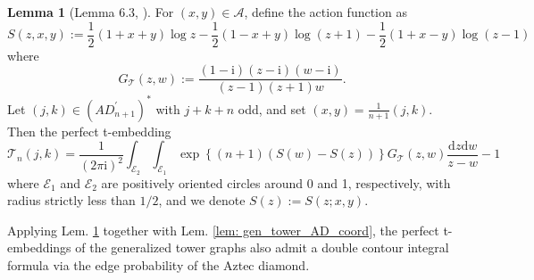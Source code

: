 \documentclass[12pt]{amsart}
\numberwithin{equation}{section}
\theoremstyle{definition}
\newtheorem{lemma}[thm]{Lemma}
\begin{document}
\begin{lemma}[Lemma 6.3, \cite{tower_AD_perfect} ]
\label{lem: t_embedding_coord_AD}
    For $(x, y) \in \mathcal A$, define the action function as 
    \[
    S(z,x,y):=\frac{1}{2}(1+x+y) \log z-\frac{1}{2}(1-x+y) \log (z+1)-\frac{1}{2}(1+x-y) \log (z-1)
    \]
    where
$$
G_{\mathcal{T}}(z, w):=\frac{(1-\mathrm{i})(z-\mathrm{i})(w-\mathrm{i})}{(z-1)(z+1) w}.
$$
Let $(j, k) \in\left(AD_{n+1}^{\prime}\right)^*$ with $j+k+n$ odd, and set $(x, y)=\frac{1}{n+1}(j, k)$. Then the perfect t-embedding
$$
\mathcal{T}_n(j, k)=\frac{1}{(2 \pi \mathrm{i})^2} \int_{\mathcal{E}_2} \int_{\mathcal{E}_1} \exp{\left\{(n+1)(S(w)-S(z))\right\}} G_{\mathcal{T}}(z, w) \frac{\mathrm d z \mathrm d w}{z-w}-1
$$
where $\mathcal{E}_1$ and $\mathcal{E}_2$ are positively oriented circles around 0 and 1, respectively, with radius strictly less than $1 / 2$, and we denote $S(z):=S(z ; x, y)$.
\end{lemma}
Applying Lem. \ref{lem: t_embedding_coord_AD} together with Lem. \ref{lem: gen_tower_AD_coord}, the perfect t-embeddings of the generalized tower graphs also admit a double contour integral formula via the edge probability of the Aztec diamond. 
\end{document}
